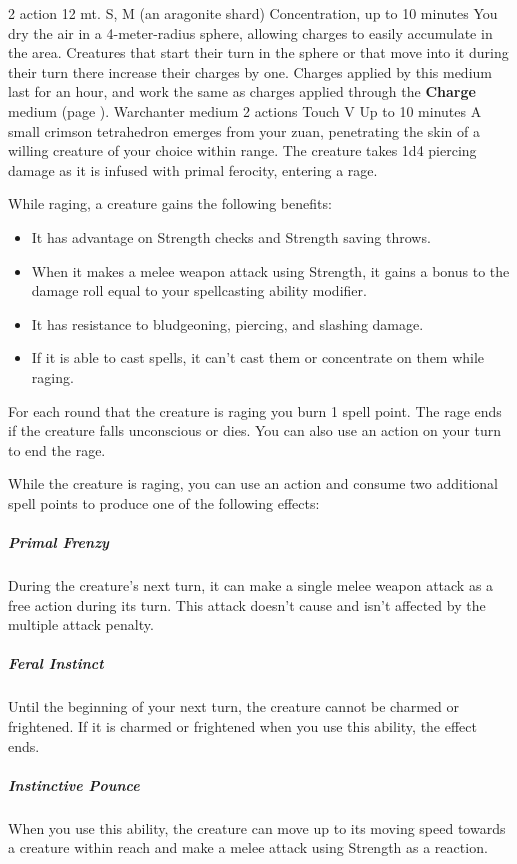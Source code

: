     {2 action}
    {12 mt.}
    {S, M (an aragonite shard)}
    {Concentration, up to 10 minutes}
    You dry the air in a 4-meter-radius sphere, allowing charges to easily accumulate in the area.
    Creatures that start their turn in the sphere or that move into it during their turn there increase their charges by one.
    Charges applied by this medium last for an hour, and work the same as charges applied through the \textbf{Charge} medium (page \pageref{medium::charge}).
    {Warchanter medium}
    {2 actions}
    {Touch}
    {V}
    {Up to 10 minutes}
    A small crimson tetrahedron emerges from your zuan, penetrating the skin of a willing creature of your choice within range.
    The creature takes 1d4 piercing damage as it is infused with primal ferocity, entering a rage.

    While raging, a creature gains the following benefits:
    \begin{itemize}
        \item It has advantage on Strength checks and Strength saving throws.
        \item When it makes a melee weapon attack using Strength, it gains a bonus to the damage roll equal to your spellcasting ability modifier.
        \item It has resistance to bludgeoning, piercing, and slashing damage.
        \item If it is able to cast spells, it can't cast them or concentrate on them while raging.
    \end{itemize}

    For each round that the creature is raging you burn 1 spell point.
    The rage ends if the creature falls unconscious or dies.
    You can also use an action on your turn to end the rage.

    While the creature is raging, you can use an action and consume two additional spell points to produce one of the following effects:
    \subparagraph{Primal Frenzy}
    During the creature's next turn, it can make a single melee weapon attack as a free action during its turn.
    This attack doesn't cause and isn't affected by the multiple attack penalty.
    \subparagraph{Feral Instinct}
    Until the beginning of your next turn, the creature cannot be charmed or frightened.
    If it is charmed or frightened when you use this ability, the effect ends.
    \subparagraph{Instinctive Pounce}
    When you use this ability, the creature can move up to its moving speed towards a creature within reach and make a melee attack using Strength as a reaction.

